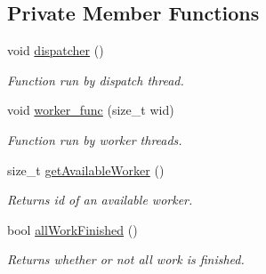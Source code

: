 \subsection*{Private Member Functions}
\begin{DoxyCompactItemize}
\item 
void \hyperlink{classnta_1_1utils_1_1ThreadPool_a2ca98ba5ed4510e5aac90c0507859b8d}{dispatcher} ()
\begin{DoxyCompactList}\small\item\em Function run by dispatch thread. \end{DoxyCompactList}\item 
\mbox{\label{classnta_1_1utils_1_1ThreadPool_ade9cec65b2ef535cb03fcc0ea941fe24}} 
void \hyperlink{classnta_1_1utils_1_1ThreadPool_ade9cec65b2ef535cb03fcc0ea941fe24}{worker\+\_\+func} (size\+\_\+t wid)
\begin{DoxyCompactList}\small\item\em Function run by worker threads. \end{DoxyCompactList}\item 
\mbox{\label{classnta_1_1utils_1_1ThreadPool_a0cf734e83b83378a70a67864e9eeb732}} 
size\+\_\+t \hyperlink{classnta_1_1utils_1_1ThreadPool_a0cf734e83b83378a70a67864e9eeb732}{get\+Available\+Worker} ()
\begin{DoxyCompactList}\small\item\em Returns id of an available worker. \end{DoxyCompactList}\item 
\mbox{\label{classnta_1_1utils_1_1ThreadPool_a545314bb70fd5cd2ecbd8759d3251cc6}} 
bool \hyperlink{classnta_1_1utils_1_1ThreadPool_a545314bb70fd5cd2ecbd8759d3251cc6}{all\+Work\+Finished} ()
\begin{DoxyCompactList}\small\item\em Returns whether or not all work is finished. \end{DoxyCompactList}\end{DoxyCompactItemize}
